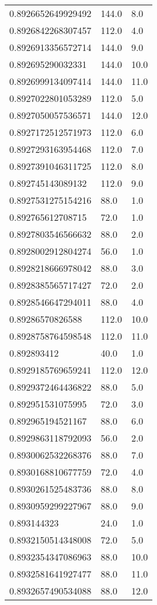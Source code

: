 \begin{center}
\begin{supertabular}[H]{p{0.30\textwidth}p{0.05\textwidth}p{0.05\textwidth}}
0.8926652649929492 & 144.0 & 8.0 \\ 
0.8926842268307457 & 112.0 & 4.0 \\ 
0.8926913356572714 & 144.0 & 9.0 \\ 
0.892695290032331 & 144.0 & 10.0 \\ 
0.8926999134097414 & 144.0 & 11.0 \\ 
0.8927022801053289 & 112.0 & 5.0 \\ 
0.8927050057536571 & 144.0 & 12.0 \\ 
0.8927172512571973 & 112.0 & 6.0 \\ 
0.8927293163954468 & 112.0 & 7.0 \\ 
0.8927391046311725 & 112.0 & 8.0 \\ 
0.892745143089132 & 112.0 & 9.0 \\ 
0.8927531275154216 & 88.0 & 1.0 \\ 
0.892765612708715 & 72.0 & 1.0 \\ 
0.8927803546566632 & 88.0 & 2.0 \\ 
0.8928002912804274 & 56.0 & 1.0 \\ 
0.8928218666978042 & 88.0 & 3.0 \\ 
0.8928385565717427 & 72.0 & 2.0 \\ 
0.8928546647294011 & 88.0 & 4.0 \\ 
0.89286570826588 & 112.0 & 10.0 \\ 
0.8928758764598548 & 112.0 & 11.0 \\ 
0.892893412 & 40.0 & 1.0 \\ 
0.8929185769659241 & 112.0 & 12.0 \\ 
0.8929372464436822 & 88.0 & 5.0 \\ 
0.892951531075995 & 72.0 & 3.0 \\ 
0.892965194521167 & 88.0 & 6.0 \\ 
0.8929863118792093 & 56.0 & 2.0 \\ 
0.8930062532268376 & 88.0 & 7.0 \\ 
0.8930168810677759 & 72.0 & 4.0 \\ 
0.8930261525483736 & 88.0 & 8.0 \\ 
0.8930959299227967 & 88.0 & 9.0 \\ 
0.893144323 & 24.0 & 1.0 \\ 
0.8932150514348008 & 72.0 & 5.0 \\ 
0.8932354347086963 & 88.0 & 10.0 \\ 
0.8932581641927477 & 88.0 & 11.0 \\ 
0.8932657490534088 & 88.0 & 12.0 \\ 

\end{supertabular}
\end{center}
